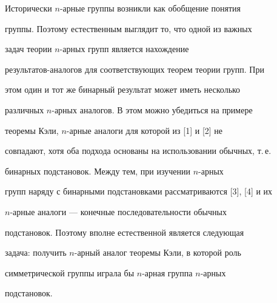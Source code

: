\date{}




\pagestyle{plain} %







\maketitle


\label{begin}























Исторически $n$-арные группы возникли как обобщение понятия


группы. Поэтому естественным выглядит то, что одной из важных


задач теории $n$-арных групп является нахождение


результатов-аналогов для соответствующих теорем теории групп. При


этом один и тот же бинарный результат может иметь несколько


различных $n$-арных аналогов. В этом можно убедиться на примере


теоремы Кэли, $n$-арные аналоги для которой из [1] и [2] не


совпадают, хотя оба подхода основаны на использовании обычных, т.\,е.


бинарных подстановок. Между тем, при изучении $n$-арных


групп наряду с бинарными подстановками рассматриваются [3], [4] и их


$n$-арные аналоги --- конечные последовательности обычных


подстановок. Поэтому вполне естественной является следующая


задача: получить $n$-арный аналог теоремы Кэли, в которой роль


симметрической группы играла бы $n$-арная группа $n$-арных


подстановок.





